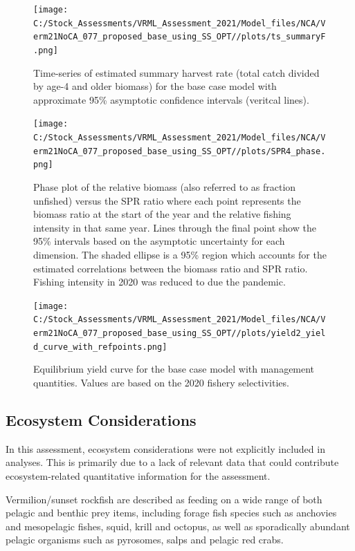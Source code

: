 \documentclass[
  english,
  a4paper,
]{article}
\begin{document}
\begin{figure}
\centering
\texttt{[image: C:/Stock\_Assessments/VRML\_Assessment\_2021/Model\_files/NCA/Verm21NoCA\_077\_proposed\_base\_using\_SS\_OPT//plots/ts\_summaryF.png]}
\caption{Time-series of estimated summary harvest rate (total catch divided by age-4 and older biomass) for the base case model with approximate 95\% asymptotic confidence intervals (veritcal lines).\label{fig:FmortalityES}}
\end{figure}

\begin{figure}
\centering
\texttt{[image: C:/Stock\_Assessments/VRML\_Assessment\_2021/Model\_files/NCA/Verm21NoCA\_077\_proposed\_base\_using\_SS\_OPT//plots/SPR4\_phase.png]}
\caption{Phase plot of the relative biomass (also referred to as fraction unfished) versus the SPR ratio where each point represents the biomass ratio at the start of the year and the relative fishing intensity in that same year. Lines through the final point show the 95\% intervals based on the asymptotic uncertainty for each dimension. The shaded ellipse is a 95\% region which accounts for the estimated correlations between the biomass ratio and SPR ratio. Fishing intensity in 2020 was reduced to due the pandemic.\label{fig:phaseES}}
\end{figure}

\begin{figure}
\centering
\texttt{[image: C:/Stock\_Assessments/VRML\_Assessment\_2021/Model\_files/NCA/Verm21NoCA\_077\_proposed\_base\_using\_SS\_OPT//plots/yield2\_yield\_curve\_with\_refpoints.png]}
\caption{Equilibrium yield curve for the base case model with management quantities. Values are based on the 2020
fishery selectivities.\label{fig:yield2ES}}
\end{figure}

\FloatBarrier

\hypertarget{ecosystem-considerations}{%
\subsection*{Ecosystem Considerations}\label{ecosystem-considerations}}

In this assessment, ecosystem considerations were not explicitly included in analyses.
This is primarily due to a lack of relevant data that could contribute ecosystem-related quantitative information for the assessment.

Vermilion/sunset rockfish are described as feeding on a wide range of both
pelagic and benthic prey items, including forage fish species such as anchovies
and mesopelagic fishes, squid, krill and octopus, as well as sporadically abundant
pelagic organisms such as pyrosomes, salps and pelagic red crabs.
\end{document}
